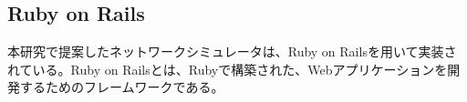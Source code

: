 \subsection{Ruby on Rails}
\label{tag:rails}
本研究で提案したネットワークシミュレータは、Ruby on Railsを用いて実装されている。Ruby on Railsとは、Rubyで構築された、Webアプリケーションを開発するためのフレームワークである。
